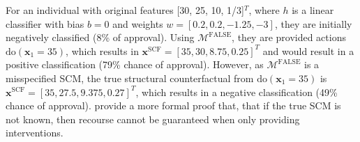 For an individual with original features [30, 25, 10, 1/3]$^T$, where $h$ is a linear classifier with bias $b=0$ and weights $w=[0.2, 0.2, -1.25, -3]$, they are initially negatively classified (8\% of approval). Using $\mathcal{M}^{\text{FALSE}}$, they are provided actions $\text{do}(\boldsymbol{x}_1=35)$, which results in $\boldsymbol{x}^{\text{SCF}} = [35, 30, 8.75, 0.25]^T$ and would result in a positive classification (79\% chance of approval). However, as $\mathcal{M}^{\text{FALSE}}$ is a misspecified SCM, the true structural counterfactual from $\text{do}(\boldsymbol{x}_1=35)$ is $\boldsymbol{x}^{\text{SCF}} = [35, 27.5, 9.375, 0.27]^T$, which results in a negative classification (49\% chance of approval). \textcite{karimiAlgorithmicRecourseImperfect2020} provide a more formal proof that, that if the true SCM is not known, then recourse cannot be guaranteed when only providing interventions.










